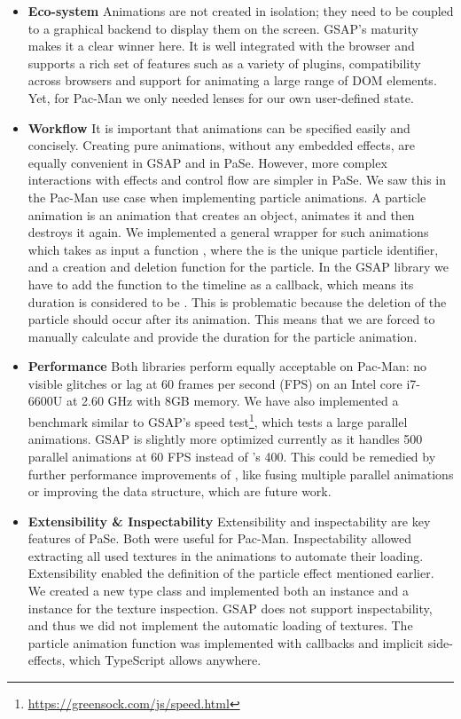 \begin{itemize}
\item \textbf{Eco-system} Animations are not created in isolation; they need to
be coupled to a graphical backend to display them on the screen.  GSAP's maturity
makes it a clear winner here. It 
is well integrated with the browser and supports a rich set of features
such as a variety of plugins, compatibility across browsers and support for
animating a large range of DOM elements. Yet, for Pac-Man we only needed
lenses for our own user-defined state.
\item \textbf{Workflow} It is important that animations can
be specified easily and concisely. Creating pure animations, without
any embedded effects, are equally convenient in GSAP and in PaSe. However, more
complex interactions with effects and control flow are simpler in PaSe. We
saw this in the Pac-Man use case when implementing particle animations.
A particle animation is an animation that creates an object, animates it
and then destroys it again. We
implemented a general wrapper for such animations which takes as input a
function , where the  is the unique particle
identifier, and a creation and deletion function for the particle. In the GSAP
library we have to add the function to the timeline as a callback, which
means its duration is considered to be . This is problematic
because the deletion of
the particle should occur after its animation. This means that we are
forced to manually calculate and provide the duration for the particle
animation.
\item \textbf{Performance} Both libraries perform 
equally acceptable on Pac-Man: no visible glitches or lag at 60
frames per second (FPS) on an Intel core i7-6600U at 2.60 GHz with 8GB memory. We have also implemented a benchmark similar to GSAP's
speed test\footnote{\url{https://greensock.com/js/speed.html}}, which tests a large parallel animations. GSAP is
slightly more optimized currently as it handles 500 parallel animations at 60 FPS instead of \dsl{}'s 400.
This could be remedied by further performance improvements of \dsl{},
like fusing multiple parallel animations or improving the  data structure, which are future work.
\item \textbf{Extensibility \& Inspectability} Extensibility and inspectability
are key features of PaSe. Both were useful for Pac-Man. Inspectability allowed 
extracting all used textures in the animations to
automate their loading. Extensibility enabled the definition of the 
particle effect mentioned earlier. We
created a new  type class and implemented both an
 instance and a  instance for the texture inspection.
GSAP does not support inspectability, and thus we did not
implement the automatic loading of textures. The particle animation function
was implemented with callbacks and implicit side-effects, which TypeScript allows anywhere.
\end{itemize}
